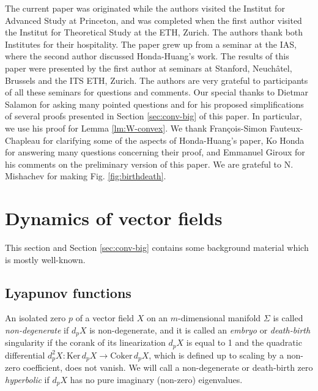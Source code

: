 \documentclass[12pt]{amsart}
\theoremstyle{plain}
\theoremstyle{definition}
\theoremstyle{remark}
\newcommand{\Ker}{\mathrm{Ker\,}}
\newcommand{\Coker}{\mathrm{Coker\,}}
\begin{document}
 \medskip{} The current paper was originated while the authors   visited the Institut for Advanced Study at Princeton, and was completed when the first author visited the Institut for Theoretical Study at the ETH, Zurich.
 The authors thank both Institutes for their hospitality. The paper grew up from a seminar at the IAS, where the second author   discussed Honda-Huang's work.
 The results of this paper were presented by the first author  at  seminars at Stanford, Neuch\^atel, Brussels and the ITS ETH, Zurich. The authors are very grateful to participants of all these seminars for   questions and comments. Our special thanks to Dietmar Salamon for asking many pointed questions and for his  proposed simplifications of several proofs presented in Section
 \ref{sec:conv-big} of this paper. In particular,   we use his proof for Lemma \ref{lm:W-convex}.
 We thank  Fran\c{c}ois-Simon Fauteux-Chapleau  for clarifying some of the aspects of Honda-Huang's paper, Ko Honda for answering many questions concerning their  proof, and Emmanuel Giroux for his comments on the preliminary version of this paper. We are grateful to N. Mishachev for making Fig. 
 \ref{fig:birthdeath}.
 
 


\section{Dynamics of vector fields}\label{sec:dynamics}
This  section   and  Section \ref{sec:conv-big} contains some background material which is mostly well-known.  \subsection{Lyapunov functions}
An isolated zero $p$ of a vector field $X$ on an $m$-dimensional manifold $\Sigma$  is called {\em non-degenerate} if $d_pX$ is non-degenerate, and it  is called an {\em embryo} or {\em death-birth} singularity if the corank of its linearization $d_pX$ is  equal to 1 and    the quadratic differential $d^2_pX:\Ker d_pX\to \Coker  d_pX$, which is  defined   up to scaling by a non-zero coefficient, does not vanish. We will call a non-degenerate   or   death-birth zero  {\em hyperbolic} if $d_pX$ has  no pure  imaginary (non-zero) eigenvalues.
\end{document}
